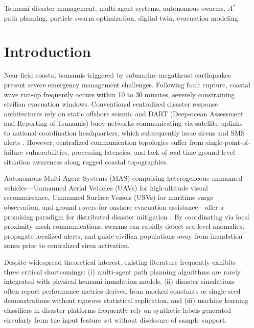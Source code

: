 \documentclass[conference]{IEEEtran}
\begin{document}
\begin{IEEEkeywords}
Tsunami disaster management, multi-agent systems, autonomous swarms, $A^*$ path planning, particle swarm optimization, digital twin, evacuation modeling.
\end{IEEEkeywords}

\section{Introduction}
Near-field coastal tsunamis triggered by submarine megathrust earthquakes present severe emergency management challenges. Following fault rupture, coastal wave run-up frequently occurs within 10 to 30 minutes, severely constraining civilian evacuation windows. Conventional centralized disaster response architectures rely on static offshore seismic and DART (Deep-ocean Assessment and Reporting of Tsunamis) buoy networks communicating via satellite uplinks to national coordination headquarters, which subsequently issue sirens and SMS alerts \cite{pradana2022, cherian2010}. However, centralized communication topologies suffer from single-point-of-failure vulnerabilities, processing latencies, and lack of real-time ground-level situation awareness along rugged coastal topographies.

Autonomous Multi-Agent Systems (MAS) comprising heterogeneous unmanned vehicles---Unmanned Aerial Vehicles (UAVs) for high-altitude visual reconnaissance, Unmanned Surface Vessels (USVs) for maritime surge observation, and ground rovers for onshore evacuation assistance---offer a promising paradigm for distributed disaster mitigation \cite{kennedy1995}. By coordinating via local proximity mesh communications, swarms can rapidly detect sea-level anomalies, propagate localized alerts, and guide civilian populations away from inundation zones prior to centralized siren activation.

Despite widespread theoretical interest, existing literature frequently exhibits three critical shortcomings: (i) multi-agent path planning algorithms are rarely integrated with physical tsunami inundation models, (ii) disaster simulations often report performance metrics derived from mocked constants or single-seed demonstrations without rigorous statistical replication, and (iii) machine learning classifiers in disaster platforms frequently rely on synthetic labels generated circularly from the input feature set without disclosure of sample support.
\end{document}
